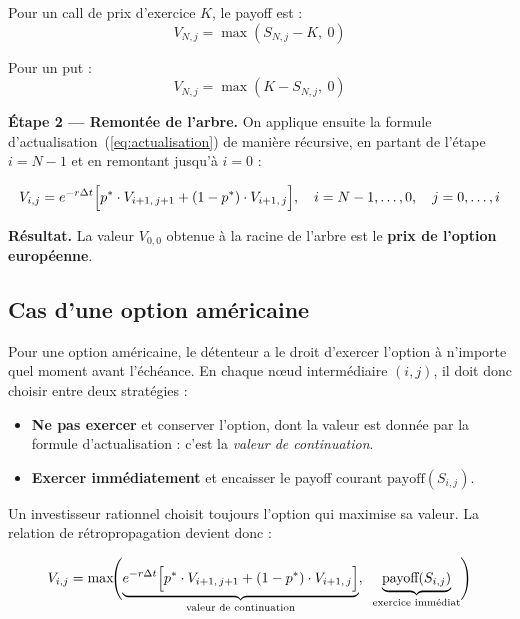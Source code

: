 \documentclass[11pt]{report}
\begin{document}
Pour un call de prix d'exercice $K$, le payoff est :
\begin{equation}
    V_{N,j} = \max(S_{N,j} - K,\ 0)
\end{equation}

Pour un put :
\begin{equation}
    V_{N,j} = \max(K - S_{N,j},\ 0)
\end{equation}

\textbf{Étape 2 — Remontée de l'arbre.}
On applique ensuite la formule d'actualisation~(\ref{eq:actualisation}) de
manière récursive, en partant de l'étape $i = N-1$ et en remontant jusqu'à
$i = 0$ :

\begin{equation}
    V_{i,j} = e^{-r \Delta t} \Bigl[ p^* \cdot V_{i+1,\, j+1}
              + (1 - p^*) \cdot V_{i+1,\, j} \Bigr],
    \quad i = N-1, \ldots, 0,\quad j = 0, \ldots, i
\end{equation}

\textbf{Résultat.} La valeur $V_{0,0}$ obtenue à la racine de l'arbre
est le \textbf{prix de l'option européenne}.

\subsection{Cas d'une option américaine}

Pour une option américaine, le détenteur a le droit d'exercer l'option
à n'importe quel moment avant l'échéance. En chaque nœud intermédiaire
$(i, j)$, il doit donc choisir entre deux stratégies :

\begin{itemize}
    \item \textbf{Ne pas exercer} et conserver l'option, dont la valeur
          est donnée par la formule d'actualisation : c'est la
          \emph{valeur de continuation}.
    \item \textbf{Exercer immédiatement} et encaisser le payoff courant
          $\text{payoff}(S_{i,j})$.
\end{itemize}

Un investisseur rationnel choisit toujours l'option qui maximise sa valeur.
La relation de rétropropagation devient donc :

\begin{equation}
    V_{i,j} = \max\!\Biggl(
        \underbrace{e^{-r \Delta t} \Bigl[ p^* \cdot V_{i+1,\, j+1}
                   + (1 - p^*) \cdot V_{i+1,\, j} \Bigr]}_{%
                   \text{valeur de continuation}},\;\;
        \underbrace{\text{payoff}(S_{i,j})}_{\text{exercice immédiat}}
    \Biggr)
\end{equation}
\end{document}
